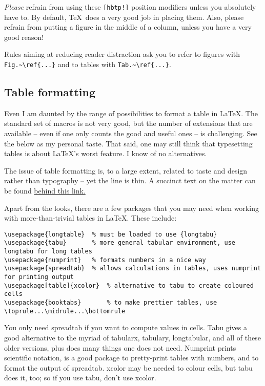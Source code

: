 \documentclass{article}
\begin{document}
\textsl{Please} refrain from using these \verb+[hbtp!]+ position modifiers unless you absolutely have to.
By default, \TeX\ does a very good job in placing them.
Also, please refrain from putting a figure in the middle of a column, unless you have a very good reason!

Rules aiming at reducing reader distraction ask you to refer to figures with \verb+Fig.~\ref{...}+ and to tables with \verb+Tab.~\ref{...}+.

\subsection{Table formatting}
Even I am daunted by the range of possibilities to format a table in \LaTeX. The standard set of macros is not very good, but the number of extensions that are available -- even if one only counts the good and useful ones -- is challenging. See the below as my personal taste.  That said, one may still think that typesetting tables is about \LaTeX's worst feature.  I know of no alternatives.

The issue of table formatting is, to a large extent, related to taste and design rather than typography -- yet the line is thin.  A succinct text on the matter can be found \href{http://users.ece.cmu.edu/~pueschel/teaching/guides/guide-tables.pdf}{behind this link.}

Apart from the looks, there are a few packages that you may need when working with more-than-trivial tables in \LaTeX.  These include:
\begin{verbatim}
\usepackage{longtable}	% must be loaded to use {longtabu}
\usepackage{tabu}		% more general tabular environment, use longtabu for long tables
\usepackage{numprint}	% formats numbers in a nice way
\usepackage{spreadtab}	% allows calculations in tables, uses numprint for printing output
\usepackage[table]{xcolor}	% alternative to tabu to create coloured cells
\usepackage{booktabs}		% to make prettier tables, use \toprule...\midrule...\bottomrule
\end{verbatim}
You only need spreadtab if you want to compute values in cells.  Tabu gives a good alternative to the myriad of tabularx, tabulary, longtabular, and all of these older versions, plus does many things one does not need.  Numprint prints scientific notation, is a good package to pretty-print tables with numbers, and to format the output of spreadtab.  xcolor may be needed to colour cells, but tabu does it, too; so if you use tabu, don't use xcolor.
\end{document}
